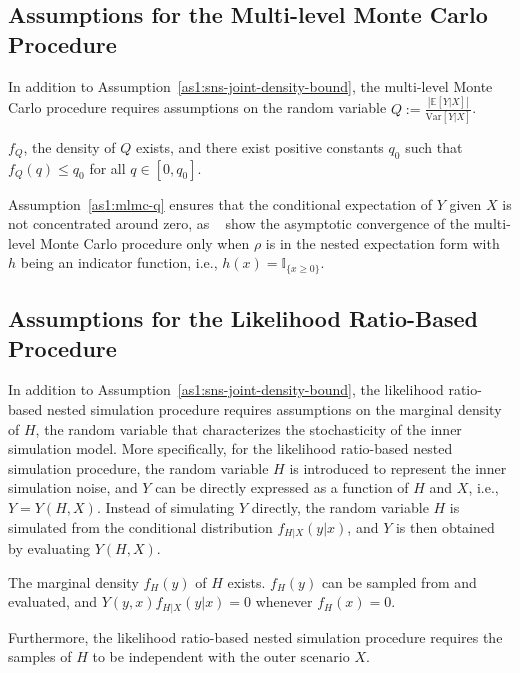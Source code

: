 \subsection{Assumptions for the Multi-level Monte Carlo Procedure}
In addition to Assumption~\ref{as1:sns-joint-density-bound}, the multi-level Monte Carlo procedure requires assumptions on the random variable $Q:= \frac{|\mathbb{E} \left[ Y | X \right]|}{\text{Var}[Y|X]}$.

\begin{assumption} \label{as1:mlmc-q}
    $f_Q$, the density of $Q$ exists, and there exist positive constants $q_0$ such that $f_Q(q) \leq q_0$ for all $q \in [0, q_0]$.
\end{assumption}

Assumption~\ref{as1:mlmc-q} ensures that the conditional expectation of $Y$ given $X$ is not concentrated around zero, as ~\cite{giles2019multilevel} show the asymptotic convergence of the multi-level Monte Carlo procedure only when $\rho$ is in the nested expectation form with $h$ being an indicator function, i.e., $h(x) = \mathbb{I}_{\{x \geq 0\}}$.

\subsection{Assumptions for the Likelihood Ratio-Based Procedure}
In addition to Assumption~\ref{as1:sns-joint-density-bound}, the likelihood ratio-based nested simulation procedure requires assumptions on the marginal density of $H$, the random variable that characterizes the stochasticity of the inner simulation model.
More specifically, for the likelihood ratio-based nested simulation procedure, the random variable $H$ is introduced to represent the inner simulation noise, and $Y$ can be directly expressed as a function of $H$ and $X$, i.e., $Y = Y(H, X)$.
Instead of simulating $Y$ directly, the random variable $H$ is simulated from the conditional distribution $f_{H|X}(y|x)$, and $Y$ is then obtained by evaluating $Y(H, X)$.

\begin{assumption} \label{as1:likelihood-ratio-marginal-density}
    The marginal density $f_H(y)$ of $H$ exists. $f_H(y)$ can be sampled from and evaluated, and $Y(y, x) f_{H|X}(y|x) = 0$ whenever $f_H(x) = 0$. 
\end{assumption}

Furthermore, the likelihood ratio-based nested simulation procedure requires the samples of $H$ to be independent with the outer scenario $X$.


